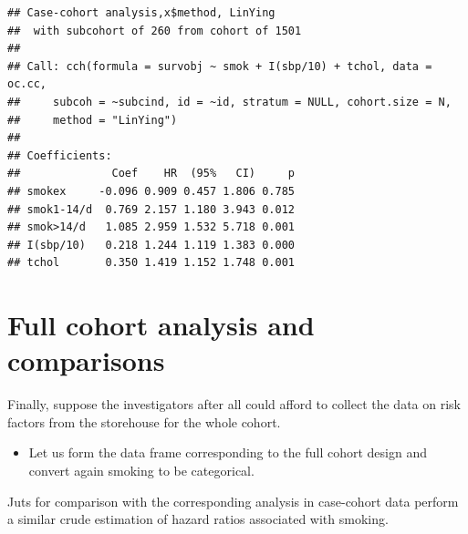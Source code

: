 \documentclass[
]{book}
\newenvironment{Shaded}{\begin{snugshade}}{\end{snugshade}}
\newcommand{\AttributeTok}[1]{\textcolor[rgb]{0.13,0.29,0.53}{#1}}
\newcommand{\FunctionTok}[1]{\textcolor[rgb]{0.13,0.29,0.53}{\textbf{#1}}}
\newcommand{\NormalTok}[1]{#1}
\newcommand{\OtherTok}[1]{\textcolor[rgb]{0.56,0.35,0.01}{#1}}
\newcommand{\SpecialCharTok}[1]{\textcolor[rgb]{0.81,0.36,0.00}{\textbf{#1}}}
\newcommand{\StringTok}[1]{\textcolor[rgb]{0.31,0.60,0.02}{#1}}
\providecommand{\tightlist}{%
  \setlength{\itemsep}{0pt}\setlength{\parskip}{0pt}}
\theoremstyle{definition}
\theoremstyle{definition}
\theoremstyle{definition}
\theoremstyle{definition}
\theoremstyle{remark}
\begin{document}
\begin{verbatim}
## Case-cohort analysis,x$method, LinYing 
##  with subcohort of 260 from cohort of 1501 
## 
## Call: cch(formula = survobj ~ smok + I(sbp/10) + tchol, data = oc.cc, 
##     subcoh = ~subcind, id = ~id, stratum = NULL, cohort.size = N, 
##     method = "LinYing")
## 
## Coefficients:
##              Coef    HR  (95%   CI)     p
## smokex     -0.096 0.909 0.457 1.806 0.785
## smok1-14/d  0.769 2.157 1.180 3.943 0.012
## smok>14/d   1.085 2.959 1.532 5.718 0.001
## I(sbp/10)   0.218 1.244 1.119 1.383 0.000
## tchol       0.350 1.419 1.152 1.748 0.001
\end{verbatim}

\section{Full cohort analysis and comparisons}\label{full-cohort-analysis-and-comparisons}

Finally, suppose the investigators after all could afford to collect the
data on risk factors from the storehouse for the whole cohort.

\begin{itemize}
\tightlist
\item
  Let us form the data frame corresponding to the full cohort design
  and convert again smoking to be categorical.
\end{itemize}

\begin{Shaded}
\end{Shaded}

Juts for comparison with the corresponding analysis in case-cohort data
perform a similar crude estimation of hazard ratios associated with smoking.
\end{document}

